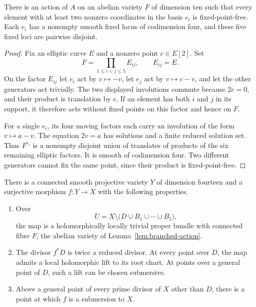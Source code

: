 \begin{lemma}
\label{lem:branched-action}
There is an action of $A$ on an abelian variety $F$ of dimension ten
such that every element with at least two nonzero coordinates in the
basis $e_i$ is fixed-point-free.  Each $e_i$ has a nonempty smooth fixed
locus of codimension four, and these five fixed loci are pairwise
disjoint.
\end{lemma}

\begin{proof}
Fix an elliptic curve $E$ and a nonzero point $c\in E[2]$.  Set
\[
 F=\prod_{1\leq i<j\leq5}E_{ij},\qquad E_{ij}=E.
\]
On the factor $E_{ij}$ let $e_i$ act by $v\mapsto-v$, let $e_j$ act by
$v\mapsto c-v$, and let the other generators act trivially.  The two
displayed involutions commute because $2c=0$, and their product is
translation by $c$.  If an element has both $i$ and $j$ in its support,
it therefore acts without fixed points on this factor and hence on
$F$.

For a single $e_i$, its four moving factors each carry an involution
of the form $v\mapsto a-v$.  The equation $2v=a$ has solutions and a
finite reduced solution set.  Thus $F^{e_i}$ is a nonempty disjoint
union of translates of products of the six remaining elliptic
factors.  It is smooth of codimension four.  Two different generators
cannot fix the same point, since their product is fixed-point-free.
\end{proof}

\begin{proposition}
\label{prop:branched-model}
There is a connected smooth projective variety $Y$ of dimension
fourteen and a surjective morphism $f:Y\to X$ with the following
properties.
\begin{enumerate}
\item Over
\[
 U=X\setminus\bigl(D\cup B_1\cup\cdots\cup B_5\bigr),
\]
the map is a holomorphically locally trivial proper bundle with
connected fibre $F$, the abelian variety of
Lemma~\ref{lem:branched-action}.
\item The divisor $f^*D$ is twice a reduced divisor.  At every point
over $D$, the map admits a local holomorphic lift to its root chart.
At points over a general point of $D$, such a lift can be chosen
submersive.
\item Above a general point of every prime divisor of $X$ other than
$D$, there is a point at which $f$ is a submersion to $X$.
\end{enumerate}
\end{proposition}

